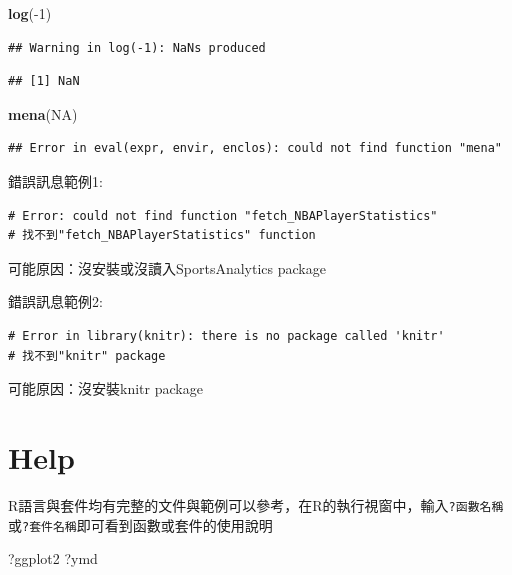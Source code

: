 \documentclass[]{book}
\newenvironment{Shaded}{\begin{snugshade}}{\end{snugshade}}
\newcommand{\KeywordTok}[1]{\textcolor[rgb]{0.13,0.29,0.53}{\textbf{{#1}}}}
\newcommand{\DecValTok}[1]{\textcolor[rgb]{0.00,0.00,0.81}{{#1}}}
\newcommand{\OtherTok}[1]{\textcolor[rgb]{0.56,0.35,0.01}{{#1}}}
\newcommand{\NormalTok}[1]{{#1}}
\theoremstyle{definition}
\theoremstyle{definition}
\theoremstyle{remark}
\begin{document}
\begin{Shaded}
\begin{Highlighting}[]
\KeywordTok{log}\NormalTok{(-}\DecValTok{1}\NormalTok{)}
\end{Highlighting}
\end{Shaded}

\begin{verbatim}
## Warning in log(-1): NaNs produced
\end{verbatim}

\begin{verbatim}
## [1] NaN
\end{verbatim}

\begin{Shaded}
\begin{Highlighting}[]
\KeywordTok{mena}\NormalTok{(}\OtherTok{NA}\NormalTok{)}
\end{Highlighting}
\end{Shaded}

\begin{verbatim}
## Error in eval(expr, envir, enclos): could not find function "mena"
\end{verbatim}

錯誤訊息範例1:

\begin{verbatim}
# Error: could not find function "fetch_NBAPlayerStatistics"
# 找不到"fetch_NBAPlayerStatistics" function
\end{verbatim}

可能原因：沒安裝或沒讀入SportsAnalytics package

錯誤訊息範例2:

\begin{verbatim}
# Error in library(knitr): there is no package called 'knitr'
# 找不到"knitr" package
\end{verbatim}

可能原因：沒安裝knitr package

\section{Help}\label{help}

R語言與套件均有完整的文件與範例可以參考，在R的執行視窗中，輸入\texttt{?函數名稱}或\texttt{?套件名稱}即可看到函數或套件的使用說明

\begin{Shaded}
\begin{Highlighting}[]
\NormalTok{?ggplot2}
\NormalTok{?ymd}
\end{Highlighting}
\end{Shaded}
\end{document}
